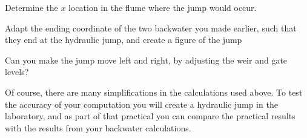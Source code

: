 \documentclass[a4paper]{article}
\begin{document}
\begin{exercise}
  Determine the $x$ location in the flume where the jump would occur.
\end{exercise}

\begin{exercise}
  Adapt the ending coordinate of the two backwater you made earlier, such that they end at the hydraulic jump, and create a figure of the jump
\end{exercise}

\begin{exercise}
  Can you make the jump move left and right, by adjusting the weir and gate levels?
\end{exercise}

Of course, there are many simplifications in the calculations used above. To test the accuracy of your computation you will create a hydraulic jump in the laboratory, and as part of that practical you can compare the practical results with the results from your backwater calculations.

\printsolutions
\end{document}
